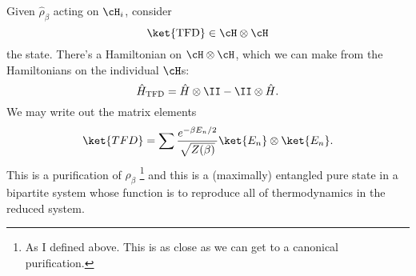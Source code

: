 Given $\hat \rho_\beta$ acting on $\cH_i$, consider
\begin{equation}
    \ket{\text{TFD}}\in \cH \otimes \cH
\end{equation}
the  state. There's a Hamiltonian on $\cH \otimes \cH$, which we can make from the Hamiltonians on the individual $\cH$s:
\begin{equation}
    \hat H_\text{TFD} = \hat H \otimes \II - \II \otimes \hat H.
\end{equation}
We may write out the matrix elements
\begin{equation}
    \ket{TFD} = \sum \frac{e^{-\beta E_n/2}}{\sqrt{Z(\beta)}} \ket{E_n} \otimes \ket{E_n}.
\end{equation}
This is a purification of $\rho_\beta$%
    \footnote{As I defined above. This is as close as we can get to a canonical purification.}
and this is a (maximally) entangled pure state in a bipartite system whose function is to reproduce all of thermodynamics in the reduced system.